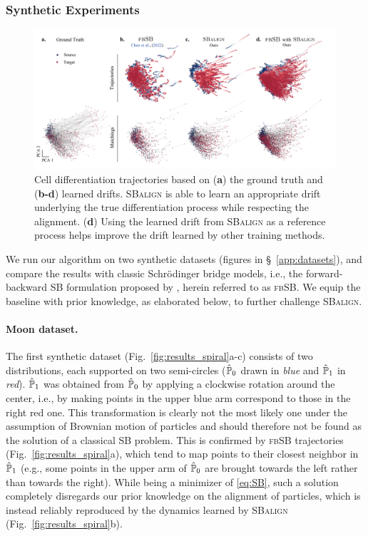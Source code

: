 \subsubsection{Synthetic Experiments}
\label{sec:synthetic}

\begin{figure}
    \centering
    \includegraphics[width=\textwidth]{figures/fig_cell_trajectories_matchings.pdf}
    \caption{Cell differentiation trajectories based on (\textbf{a}) the ground truth and (\textbf{b-d}) learned drifts. \textsc{SBalign} is able to learn an appropriate drift underlying the true differentiation process while respecting the alignment. (\textbf{d}) Using the learned drift from \textsc{SBalign} as a reference process helps improve the drift learned by other training methods.}
    \label{fig:results_cell_traj}
\end{figure}

We run our algorithm on two synthetic datasets (figures in \S~\ref{app:datasets}), and compare the results with classic Schr\"odinger bridge models, i.e., the forward-backward SB formulation proposed by \cite{chen2021likelihood}, herein referred to as \textsc{fbSB}. We equip the baseline with prior knowledge, as elaborated below, to further challenge \textsc{SBalign}.

\paragraph{Moon dataset.}
The first synthetic dataset (Fig.~\ref{fig:results_spiral}a-c) consists of two distributions, each supported on two semi-circles ($\hat{\mathbb{P}}_{ {0} }$ drawn in \textit{blue} and $\hat{\mathbb{P}}_{ {1}}$ in \textit{red}).
$\hat{\mathbb{P}}_{ {1}}$ was obtained from $\hat{\mathbb{P}}_{ {0} }$ by applying a clockwise rotation around the center, i.e., by making points in the upper blue arm correspond to those in the right red one.
This transformation is clearly not the most likely one under the assumption of Brownian motion of particles and should therefore not be found as the solution of a classical SB problem. 
This is confirmed by \textsc{fbSB} trajectories (Fig.~\ref{fig:results_spiral}a), which tend to map points to their closest neighbor in $\hat{\mathbb{P}}_{ {1}}$ (e.g., some points in the upper arm of $\hat{\mathbb{P}}_{ {0} }$ are brought towards the left rather than towards the right). 
While being a minimizer of \eqref{eq:SB}, such a solution completely disregards our prior knowledge on the alignment of particles, which is instead reliably reproduced by the dynamics learned by \textsc{SBalign} (Fig.~\ref{fig:results_spiral}b).

